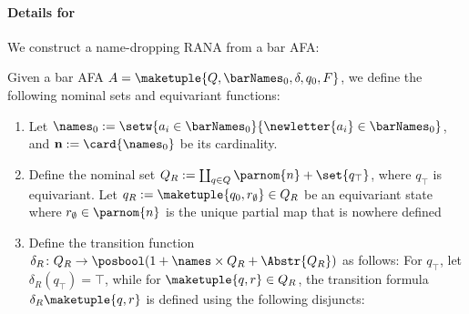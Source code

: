 \documentclass[10pt, final, conference, a4paper, twocolumn]{IEEEtran}
\begin{document}
\paragraph*{Details for~} We construct a name-dropping RANA from a bar AFA:

\begin{construction}\label{constr:bafa2rana}
  Given a bar AFA $A = \maketuple{Q, \barNames_0, \delta, q_0, F}$, we define the following nominal sets and equivariant functions:
  \begin{enumerate}
    \item Let $\names_0 := \setw{a_i \in \barNames_0}{\newletter{a_i} \in \barNames_0}$, and $\mathbf{n}
      := \card{\names_0}$ be its cardinality.
    \item Define the nominal set $Q_{R} := \coprod_{q \in Q} \parnom{n} + \set{q_\top}$, where
      $q_{\top}$ is equivariant. Let $q_R := \maketuple{q_0, r_\emptyset} \in Q_R$ be an equivariant state
      where $r_\emptyset \in \parnom{n}$ is the unique partial map that is nowhere defined
    \item Define the transition function $\delta_R\colon Q_R \to \posbool(1 + \names \times Q_R + \Abstr{Q_R})$
      as follows: For ${q_{\top}}$, let $\delta_{R}({q_\top}) = \top$, while for
      $\maketuple{q,r} \in Q_R$, the transition formula $\delta_R\maketuple{q,r}$ is defined using the following disjuncts:
\end{enumerate}
\end{construction}
\end{document}
